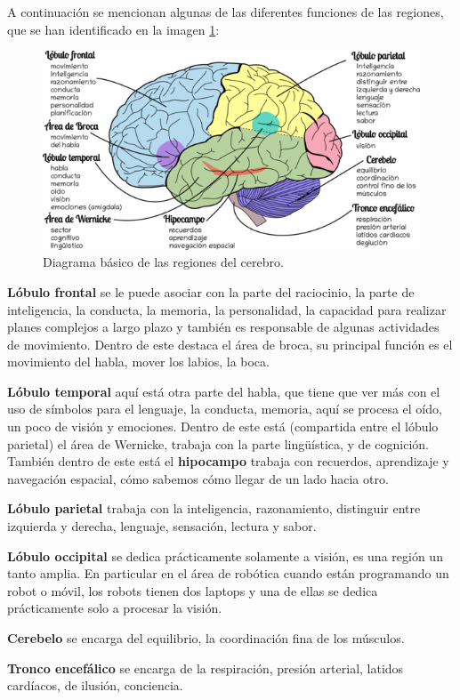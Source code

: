 A continuación se mencionan algunas de las diferentes funciones de las regiones, que se han identificado en la imagen \ref{cerebro}: 

 \begin{figure}[h]
  \centering
  \includegraphics[scale=0.7]{../Figuras/cerebro.png}
  \caption{Diagrama básico de las regiones del cerebro.}\label{cerebro}
 \end{figure}

\begin{description}
 \item \textbf{Lóbulo frontal} se le puede asociar con la parte del raciocinio,  la parte de inteligencia, la conducta, la memoria, la personalidad, la capacidad para realizar planes complejos a largo plazo y también es responsable de algunas actividades de movimiento. Dentro de este destaca el área de broca, su principal función es el movimiento del habla, mover los labios, la boca.
 \item \textbf{Lóbulo temporal} aquí está otra parte del habla, que tiene que ver más con el uso de símbolos para el lenguaje, la conducta, memoria, aquí se procesa el oído, un poco de visión y emociones. Dentro de este está (compartida entre el lóbulo parietal) el área de Wernicke, trabaja con la parte lingüística, y de cognición. También dentro de este está el \textbf{hipocampo} trabaja con recuerdos, aprendizaje y navegación espacial, cómo sabemos cómo llegar de un lado hacia otro.
 \item \textbf{Lóbulo parietal} trabaja con la inteligencia, razonamiento, distinguir entre izquierda y derecha, lenguaje, sensación, lectura y sabor. 
 \item \textbf{Lóbulo occipital} se dedica prácticamente solamente a visión, es una región un tanto amplia. En particular en el área de robótica cuando están programando un robot o móvil, los robots tienen dos laptops y una de ellas se dedica prácticamente solo a procesar la visión.
 \item \textbf{Cerebelo} se encarga del equilibrio, la coordinación fina de los músculos.
 \item \textbf{Tronco encefálico} se encarga de la respiración, presión arterial, latidos cardíacos, de ilusión, conciencia. 
\end{description}

